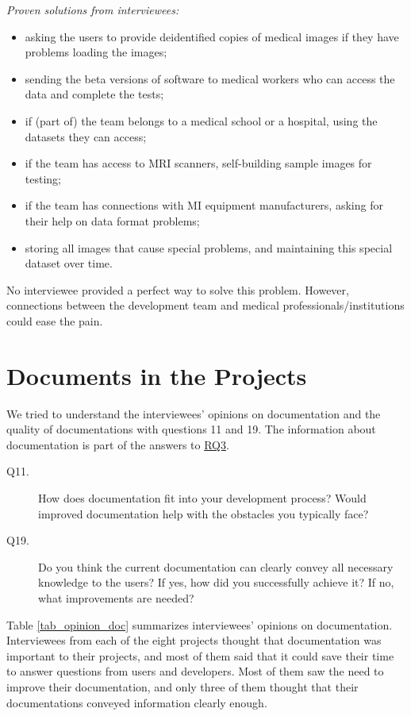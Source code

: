 \noindent\textit{Proven solutions from interviewees:}
\begin{itemize}
\item asking the users to provide deidentified copies of medical images if they have problems loading the images;
\item sending the beta versions of software to medical workers who can access the data and complete the tests;
\item if (part of) the team belongs to a medical school or a hospital, using the datasets they can access;
\item if the team has access to MRI scanners, self-building sample images for testing;
\item if the team has connections with MI equipment manufacturers, asking for their help on data format problems;
\item storing all images that cause special problems, and maintaining this special dataset over time.
\end{itemize}

No interviewee provided a perfect way to solve this problem. However, connections between the development team and medical professionals/institutions could ease the pain.

\section{Documents in the Projects}
\label{sec_interview_documents}
We tried to understand the interviewees' opinions on documentation and the quality of documentations with questions 11 and 19. The information about documentation is part of the answers to \hyperlink{rq3}{RQ3}.

\begin{description}
\item[Q11.] How does documentation fit into your development process? Would improved documentation help with the obstacles you typically face?
\item[Q19.] Do you think the current documentation can clearly convey all necessary knowledge to the users? If yes, how did you successfully achieve it? If no, what improvements are needed?
\end{description}

Table \ref{tab_opinion_doc} summarizes interviewees' opinions on documentation. Interviewees from each of the eight projects thought that documentation was important to their projects, and most of them said that it could save their time to answer questions from users and developers. Most of them saw the need to improve their documentation, and only three of them thought that their documentations conveyed information clearly enough. 

